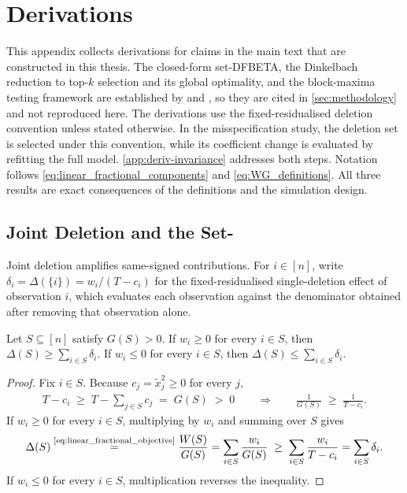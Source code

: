 \documentclass[../main.tex]{subfiles}
\begin{document}
\section{Derivations}
\label{app:derivations}

This appendix collects derivations for claims in the main text that are constructed in this thesis. The closed-form set-DFBETA, the Dinkelbach reduction to top-\(k\) selection and its global optimality, and the block-maxima testing framework are established by \textcite{konrad2026finding} and \textcite{konrad2026testing}, so they are cited in \autoref{sec:methodology} and not reproduced here. The derivations use the fixed-residualised deletion convention unless stated otherwise. In the misspecification study, the deletion set is selected under this convention, while its coefficient change is evaluated by refitting the full model. \autoref{app:deriv-invariance} addresses both steps. Notation follows \autoref{eq:linear_fractional_components} and \autoref{eq:WG_definitions}. All three results are exact consequences of the definitions and the simulation design.

\subsection{Joint Deletion and the Set-\dfbetas{}}
\label{app:deriv-joint}

Joint deletion amplifies same-signed contributions. For \(i\in[n]\), write \(\delta_i=\Delta(\{i\})=w_i/(T-c_i)\) for the fixed-residualised single-deletion effect of observation \(i\), which evaluates each observation against the denominator obtained after removing that observation alone.

\begin{lemma}
\label{lem:superadditive}
Let \(S\subseteq[n]\) satisfy \(G(S)>0\). If \(w_i\geq0\) for every \(i\in S\), then \(\Delta(S)\geq\sum_{i\in S}\delta_i\). If \(w_i\leq0\) for every \(i\in S\), then \(\Delta(S)\leq\sum_{i\in S}\delta_i\).
\end{lemma}

\begin{proof}
Fix \(i\in S\). Because \(c_j=\widetilde{x}_j^2\geq0\) for every \(j\),
\begin{align*}
T-c_i
\;\geq\;
T-\sum_{j\in S}c_j
\;=\;
G(S)
\;>\;0
\qquad\Longrightarrow\qquad
\frac{1}{G(S)}\;\geq\;\frac{1}{T-c_i}.
\end{align*}
If \(w_i\geq0\) for every \(i\in S\), multiplying by \(w_i\) and summing over \(S\) gives
\begin{align*}
\Delta(S)
\overset{\text{\eqref{eq:linear_fractional_objective}}}{=}
\frac{W(S)}{G(S)}
=\sum_{i\in S}\frac{w_i}{G(S)}
\;\geq\;
\sum_{i\in S}\frac{w_i}{T-c_i}
=\sum_{i\in S}\delta_i .
\end{align*}
If \(w_i\leq0\) for every \(i\in S\), multiplication reverses the inequality.
\end{proof}
\end{document}

